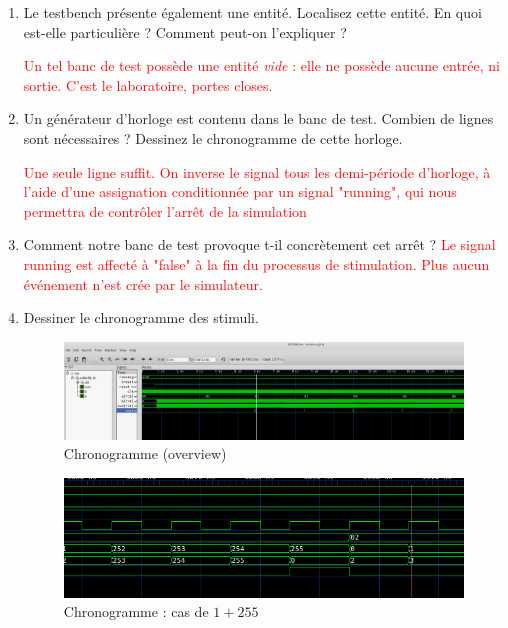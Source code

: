 \documentclass[a4paper,11pt]{article}
\begin{document}
\begin{enumerate}
  \item Le testbench présente également une entité. Localisez cette entité. En quoi est-elle particulière ? Comment peut-on l'expliquer ?

      \textcolor{red}{Un tel banc de test possède une entité {\it vide} :
      elle ne possède aucune entrée, ni sortie. C'est le laboratoire, portes closes.}

  \item Un générateur d'horloge est contenu dans le banc de test. Combien de lignes sont nécessaires ? Dessinez le chronogramme de cette horloge.

    \textcolor{red}{Une seule ligne suffit. On inverse le signal tous les demi-période d'horloge, à l'aide d'une assignation conditionnée par un signal
"running", qui nous permettra de contrôler l'arrêt de la simulation}

  \item Comment notre banc de test provoque t-il concrètement cet arrêt ?
\textcolor{red}{Le signal running est affecté à "false" à la fin du processus de stimulation. Plus aucun événement n'est crée par le simulateur.}

  \item Dessiner le chronogramme des stimuli.
  \begin{figure}
    \centering
    \includegraphics[width=15cm]{./code/gtkwave_adder8b.png}
    \caption{Chronogramme (overview)}
    \label{fig:signed}
  \end{figure}

  \begin{figure}
    \centering
    \includegraphics[width=15cm]{./code/gtkwave_adder8b_1_255.png}
    \caption{Chronogramme : cas de $1+255$}
    \label{fig:signed}
  \end{figure}


\end{enumerate}
\end{document}
